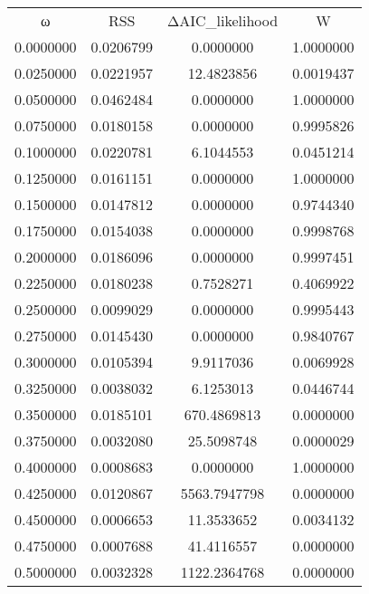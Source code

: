 \begin{tabular}{cccc}
ω & RSS & ΔAIC_likelihood & W\\
0.0000000 & 0.0206799 & 0.0000000 & 1.0000000\\
0.0250000 & 0.0221957 & 12.4823856 & 0.0019437\\
0.0500000 & 0.0462484 & 0.0000000 & 1.0000000\\
0.0750000 & 0.0180158 & 0.0000000 & 0.9995826\\
0.1000000 & 0.0220781 & 6.1044553 & 0.0451214\\
0.1250000 & 0.0161151 & 0.0000000 & 1.0000000\\
0.1500000 & 0.0147812 & 0.0000000 & 0.9744340\\
0.1750000 & 0.0154038 & 0.0000000 & 0.9998768\\
0.2000000 & 0.0186096 & 0.0000000 & 0.9997451\\
0.2250000 & 0.0180238 & 0.7528271 & 0.4069922\\
0.2500000 & 0.0099029 & 0.0000000 & 0.9995443\\
0.2750000 & 0.0145430 & 0.0000000 & 0.9840767\\
0.3000000 & 0.0105394 & 9.9117036 & 0.0069928\\
0.3250000 & 0.0038032 & 6.1253013 & 0.0446744\\
0.3500000 & 0.0185101 & 670.4869813 & 0.0000000\\
0.3750000 & 0.0032080 & 25.5098748 & 0.0000029\\
0.4000000 & 0.0008683 & 0.0000000 & 1.0000000\\
0.4250000 & 0.0120867 & 5563.7947798 & 0.0000000\\
0.4500000 & 0.0006653 & 11.3533652 & 0.0034132\\
0.4750000 & 0.0007688 & 41.4116557 & 0.0000000\\
0.5000000 & 0.0032328 & 1122.2364768 & 0.0000000\\
\end{tabular}
